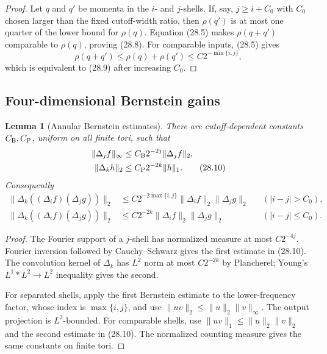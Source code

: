\documentclass[11pt,oneside]{book}
\newtheorem{lemma}[theorem]{Lemma}
\theoremstyle{definition}
\theoremstyle{remark}
\begin{document}
\begin{proof}
Let \(q\) and \(q'\) be momenta in the \(i\)- and \(j\)-shells.
If, say, \(j\geq i+C_0\) with \(C_0\) chosen larger than the fixed
cutoff-width ratio, then \(\rho(q')\) is at most one quarter of the
lower bound for \(\rho(q)\).  Equation (28.5) makes
\(\rho(q+q')\) comparable to \(\rho(q)\), proving (28.8).
For comparable inputs, (28.5) gives
\[
 \rho(q+q')\leq\rho(q)+\rho(q')
 \leq C2^{-\min\{i,j\}},
\]
which is equivalent to (28.9) after increasing \(C_0\).
\end{proof}

\subsection{Four-dimensional Bernstein gains}

\begin{lemma}[Annular Bernstein estimates]
\label{lem:e8v28-Bernstein}
There are cutoff-dependent constants \(C_{\rm B},C_{\rm P}\),
uniform on all finite tori, such that
\[
\begin{split}
 \|\Delta_jf\|_\infty
 &\leq C_{\rm B}2^{-2j}\|\Delta_jf\|_2,\\
 \|\Delta_k h\|_2
 &\leq C_{\rm P}2^{-2k}\|h\|_1.                                 \tag{28.10}
\end{split}
\]
Consequently
\[
\begin{split}
 \|\Delta_k((\Delta_if)(\Delta_jg))\|_2
 &\leq C2^{-2\max\{i,j\}}
       \|\Delta_if\|_2\|\Delta_jg\|_2
       &&(|i-j|>C_0),\\
 \|\Delta_k((\Delta_if)(\Delta_jg))\|_2
 &\leq C2^{-2k}
       \|\Delta_if\|_2\|\Delta_jg\|_2
       &&(|i-j|\leq C_0).                                       \tag{28.11}
\end{split}
\]
\end{lemma}

\begin{proof}
The Fourier support of a \(j\)-shell has normalized measure at most
\(C2^{-4j}\).  Fourier inversion followed by Cauchy--Schwarz gives
the first estimate in (28.10).  The convolution kernel of
\(\Delta_k\) has \(L^2\) norm at most \(C2^{-2k}\) by Plancherel;
Young's \(L^1*L^2\to L^2\) inequality gives the second.

For separated shells, apply the first Bernstein estimate to the
lower-frequency factor, whose index is \(\max\{i,j\}\), and use
\(\|uv\|_2\leq\|u\|_2\|v\|_\infty\).  The output projection is
\(L^2\)-bounded.  For comparable shells, use
\(\|uv\|_1\leq\|u\|_2\|v\|_2\) and the second estimate in (28.10).
The normalized counting measure gives the same constants on finite
tori.
\end{proof}
\end{document}
